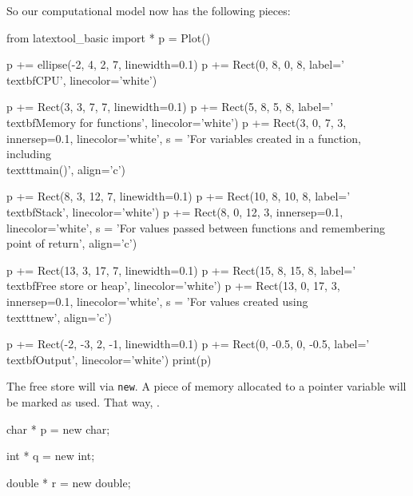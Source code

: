 So our computational model now has the following pieces:
\begin{python}
from latextool_basic import *
p = Plot()

p += ellipse(-2, 4, 2, 7, linewidth=0.1)
p += Rect(0, 8, 0, 8, label='\\textbf{CPU}', linecolor='white')

p += Rect(3, 3, 7, 7, linewidth=0.1)
p += Rect(5, 8, 5, 8, label='\\textbf{Memory for functions}', linecolor='white')
p += Rect(3, 0, 7, 3, innersep=0.1, linecolor='white', s = 'For variables created in a function, including \\texttt{main()}', align='c')

p += Rect(8, 3, 12, 7, linewidth=0.1)
p += Rect(10, 8, 10, 8, label='\\textbf{Stack}', linecolor='white')
p += Rect(8, 0, 12, 3, innersep=0.1, linecolor='white', s = 'For values passed between functions and remembering point of return', align='c')

p += Rect(13, 3, 17, 7, linewidth=0.1)
p += Rect(15, 8, 15, 8, label='\\textbf{Free store or heap}', linecolor='white')
p += Rect(13, 0, 17, 3, innersep=0.1, linecolor='white', s = 'For values created using \\texttt{new}', align='c')

p += Rect(-2, -3, 2, -1, linewidth=0.1)
p += Rect(0, -0.5, 0, -0.5, label='\\textbf{Output}', linecolor='white')
print(p)
\end{python}
The free store will  via \texttt{new}. A piece of memory allocated to a pointer variable will be marked as used. That way, .

char * p = new char;

int * q = new int;

double * r = new double;

